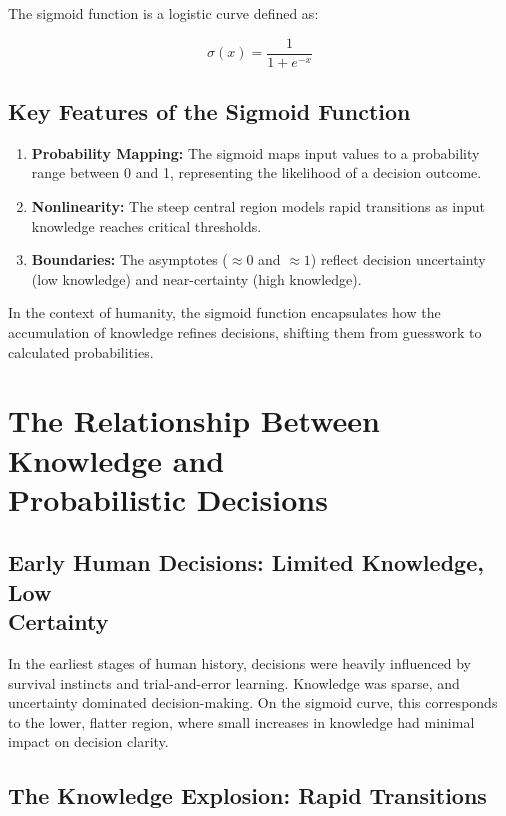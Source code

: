 \documentclass[a4]{article}
\begin{document}
The sigmoid function is a logistic curve defined as:

$$
\sigma(x) = \frac{1}{1 + e^{-x}}
$$

\subsection*{Key Features of the Sigmoid Function}

\begin{enumerate}[1.]
\item  {\bf Probability Mapping:}  The sigmoid maps input values to a probability range between 0 and 1, representing the likelihood of a decision outcome.
\item {\bf Nonlinearity:}  The steep central region models rapid transitions as input knowledge reaches critical thresholds.
\item {\bf Boundaries:}  The asymptotes ($\approx 0$ and $\approx 1$) reflect decision uncertainty (low knowledge) and near-certainty (high knowledge).
\end{enumerate}

In the context of humanity, the sigmoid function encapsulates how the accumulation of knowledge refines decisions, shifting them from guesswork to calculated probabilities.



\section{The Relationship Between Knowledge and\\ Probabilistic Decisions}

\subsection{Early Human Decisions: Limited Knowledge, Low\\ Certainty}

In the earliest stages of human history, decisions were heavily influenced by survival instincts and trial-and-error learning. Knowledge was sparse, and uncertainty dominated decision-making. On the sigmoid curve, this corresponds to the lower, flatter region, where small increases in knowledge had minimal impact on decision clarity.

\subsection{The Knowledge Explosion: Rapid Transitions}
\end{document}
